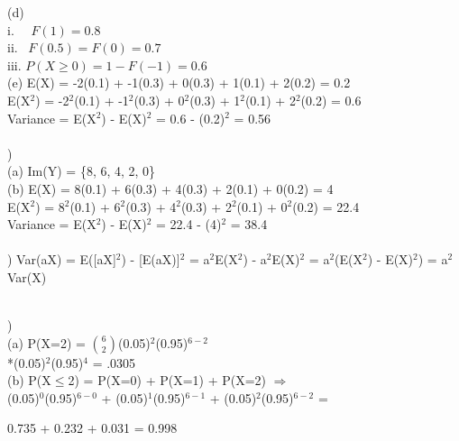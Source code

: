 \documentclass[12pt]{article}
\begin{document}
\indent (d) \\
\indent \indent i. \ \ $F(1) = 0.8$\\[.4em]
\indent \indent ii. \ $F(0.5) = F(0) = 0.7$\\[.4em]
\indent \indent iii. $P(X \ge 0) = 1-F(-1) = 0.6$\\

\indent (e) E(X) = -2(0.1) + -1(0.3) + 0(0.3) + 1(0.1) + 2(0.2) = 0.2\\[.4em]
\indent \indent E(X$^2$) = -2$^2$(0.1) + -1$^2$(0.3) + 0$^2$(0.3) + 1$^2$(0.1) + 2$^2$(0.2) = 0.6\\[.4em]
\indent \indent Variance = E(X$^2$) - E(X)$^2$ = 0.6 - (0.2)$^2$ = 0.56\\



\noindent \hrulefill \\


)\\
\indent (a) Im(Y) = \{8, 6, 4, 2, 0\}\\

\indent (b) E(X) = 8(0.1) + 6(0.3) + 4(0.3) + 2(0.1) + 0(0.2) = 4\\[.4em]
\indent \indent E(X$^2$) = 8$^2$(0.1) + 6$^2$(0.3) + 4$^2$(0.3) + 2$^2$(0.1) + 0$^2$(0.2) = 22.4\\[.4em]
\indent \indent Variance = E(X$^2$) - E(X)$^2$ = 22.4 - (4)$^2$ = 38.4\\


\noindent \hrulefill \\


) Var(aX) = E([aX]$^2$) - [E(aX)]$^2$ = a$^2$E(X$^2$) - a$^2$E(X)$^2$ = a$^2$(E(X$^2$) - E(X)$^2$) =  a$^2$Var(X)


\noindent \hrulefill \\


) \\ 
\indent (a) P(X=2) = {\Large$\binom{6}{2}$}(0.05)$^2$(0.95)$^{6-2}$\\[.4em]
\indent {}*(0.05)$^2$(0.95)$^{4}$ = .0305\\

\indent (b) P(X$\le$2) = P(X=0) + P(X=1) + P(X=2) $\Rightarrow$\\[.4em]
\indent {}(0.05)$^0$(0.95)$^{6-0}$ +
(0.05)$^1$(0.95)$^{6-1}$ +
(0.05)$^2$(0.95)$^{6-2}$ =\\[.4em]
\centerline{ 0.735 + 0.232 + 0.031 = 0.998 }
\end{document}
